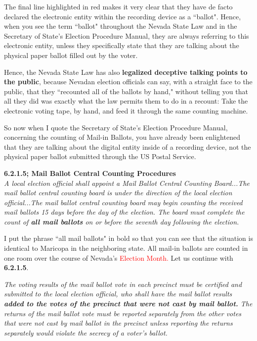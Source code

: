 \documentclass[preprint,13pt]{elsarticle}
\begin{document}
The final line highlighted in red makes it very clear that they have de facto declared the electronic entity within the recording device as a ``ballot". Hence, when you see the term ``ballot" throughout the Nevada State Law and in the Secretary of State's Election Procedure Manual, they are always referring to this electronic entity, unless they specifically state that they are talking about the physical paper ballot filled out by the voter.

Hence, the Nevada State Law has also \textbf{legalized deceptive talking points to the public}, because Nevadan election officials can say, with a straight face to the public, that they ``recounted all of the ballots by hand," without telling you that all they did was exactly what the law permits them to do in a recount: Take the electronic voting tape, by hand, and feed it through the same counting machine.

So now when I quote the Secretary of State's Election Procedure Manual, concerning the counting of Mail-in Ballots, you have already been enlightened that they are talking about the digital entity inside of a recording device, not the physical paper ballot submitted through the US Postal Service.

\textbf{6.2.1.5; Mail Ballot Central Counting Procedures}\\
\textit{A local election official shall appoint a Mail Ballot Central Counting Board...The mail ballot central counting board is under the direction of the local
election official...The mail ballot central counting board may begin counting the received mail ballots 15 days before the day of the election. The board must complete the count of \textbf{all mail ballots} on or before the seventh day following the
election.}

I put the phrase ``all mail ballots" in bold so that you can see that the situation is identical to Maricopa in the neighboring state. All mail-in ballots are counted in one room over the course of Nevada's \textcolor{red}{Election Month.} Let us continue with \textbf{6.2.1.5}.

\textit{The voting results of the mail ballot vote in each precinct must be certified and submitted to the local election official, who shall have the mail ballot results \textbf{added to the votes of the precinct that were not cast by mail ballot.} The returns of the mail ballot vote must be reported separately from the other votes that were not cast by mail ballot in the precinct unless reporting the returns separately would violate the secrecy of a voter’s
ballot.}
\end{document}
